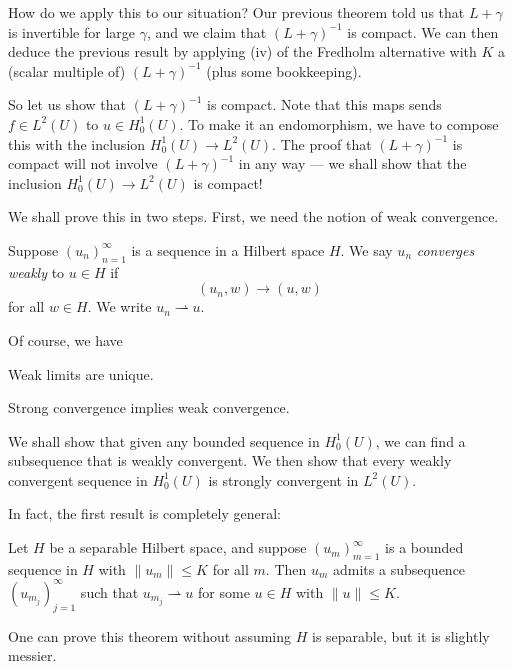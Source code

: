 \documentclass[a4paper]{article}
\begin{document}
How do we apply this to our situation? Our previous theorem told us that $L + \gamma$ is invertible for large $\gamma$, and we claim that $(L + \gamma)^{-1}$ is compact. We can then deduce the previous result by applying (iv) of the Fredholm alternative with $K$ a (scalar multiple of) $(L + \gamma)^{-1}$ (plus some bookkeeping).

So let us show that $(L + \gamma)^{-1}$ is compact. Note that this maps sends $f \in L^2(U)$ to $u \in H_0^1(U)$. To make it an endomorphism, we have to compose this with the inclusion $H_0^1(U) \to L^2(U)$. The proof that $(L + \gamma)^{-1}$ is compact will not involve $(L + \gamma)^{-1}$ in any way --- we shall show that the inclusion $H_0^1(U) \to L^2(U)$ is compact!

We shall prove this in two steps. First, we need the notion of weak convergence.

\begin{defi}
  Suppose $(u_n)_{n = 1}^\infty$ is a sequence in a Hilbert space $H$. We say $u_n$ \emph{converges weakly} to $u \in H$ if
  \[
    (u_n, w) \to (u, w)
  \]
  for all $w \in H$. We write $u_n \rightharpoonup u$.
\end{defi}

Of course, we have
\begin{lemma}
  Weak limits are unique.\qedsym
\end{lemma}

\begin{lemma}
  Strong convergence implies weak convergence.\qedsym
\end{lemma}

We shall show that given any bounded sequence in $H_0^1(U)$, we can find a subsequence that is weakly convergent. We then show that every weakly convergent sequence in $H_0^1(U)$ is strongly convergent in $L^2(U)$.

In fact, the first result is completely general:
\begin{thm}
  Let $H$ be a separable Hilbert space, and suppose $(u_m)_{m = 1}^\infty$ is a bounded sequence in $H$ with $\|u_m\| \leq K$ for all $m$. Then $u_m$ admits a subsequence $(u_{m_j})_{j = 1}^\infty$ such that $u_{m_j} \rightharpoonup u$ for some $u \in H$ with $\|u\| \leq K$.
\end{thm}
One can prove this theorem without assuming $H$ is separable, but it is slightly messier.
\end{document}
